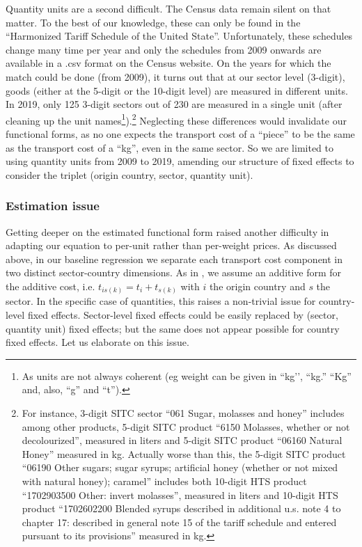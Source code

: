 \documentclass[a4paper,11pt]{article}
\begin{document}
Quantity units are a second difficult. The Census data remain silent on that matter. To the best of our knowledge, these can only be found in the ``Harmonized Tariff Schedule of the United State''. Unfortunately, these schedules change many time per year and only the schedules from 2009 onwards are available in a .csv format on the Census website. On the years for which the match could be done (from 2009), it turns out that at our sector level (3-digit), goods (either at the 5-digit or the 10-digit level) are measured in different units. In 2019, only 125 3-digit sectors out of 230 are measured in a single unit (after cleaning up the unit names\footnote{As units are not always coherent (eg weight can be given in ``kg’’, ``kg.'' ``Kg'' and, also, ``g'' and ``t'').}).\footnote{For instance, 3-digit SITC sector ``061 Sugar, molasses and honey'' includes among other products, 5-digit SITC product ``6150 Molasses, whether or not decolourized'', measured in liters and 5-digit SITC product ``06160 Natural Honey'' measured in kg. Actually worse than this, the 5-digit SITC product ``06190 Other sugars; sugar syrups; artificial honey (whether or not mixed with natural honey); caramel'' includes both 10-digit HTS product ``1702903500 Other: invert molasses'', measured in liters and 10-digit HTS product ``1702602200 Blended syrups described in additional u.s. note 4 to chapter 17: described in general note 15 of the tariff schedule and entered pursuant to its provisions''  measured in kg.} Neglecting these differences would invalidate our functional forms, as no one expects the transport cost of a ``piece'' to be the same as the transport cost of a ``kg'', even in the same sector.
So we are limited to using quantity units from 2009 to 2019, amending our structure of fixed effects to consider the triplet (origin country, sector, quantity unit).

\subsubsection{Estimation issue}

Getting deeper on the estimated functional form raised another difficulty in adapting our equation to per-unit rather than per-weight prices. As discussed above, in our baseline regression we separate each transport cost component in two distinct sector-country dimensions. As in \cite{Irrazabal_2015}, we assume an additive form for the additive cost, i.e. $t_{is(k)} = t_i+t_{s(k)}$ with $i$ the origin country and $s$ the sector. In the specific case of quantities, this raises a non-trivial issue for country-level fixed effects. Sector-level fixed effects could be easily replaced by (sector, quantity unit) fixed effects; but the same does not appear possible for country fixed effects. Let us elaborate on this issue.
\end{document}
